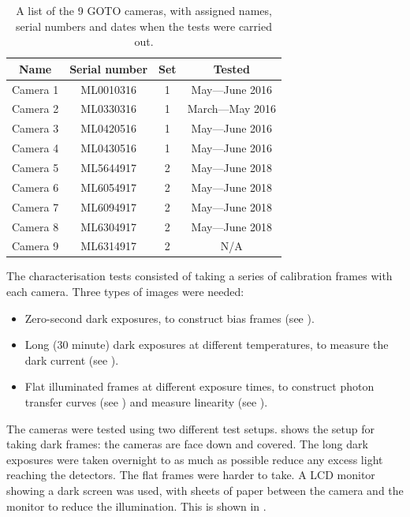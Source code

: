 \begin{colsection}
\begin{colsection}
\begin{table}[t]
    \begin{center}
        \begin{tabular}{c|ccc} %
            Name     & Serial number & Set & Tested \\
            \midrule
            Camera 1 & ML0010316     &   1 & May---June 2016  \\
            Camera 2 & ML0330316     &   1 & March---May 2016 \\
            Camera 3 & ML0420516     &   1 & May---June 2016  \\
            Camera 4 & ML0430516     &   1 & May---June 2016  \\
            Camera 5 & ML5644917     &   2 & May---June 2018  \\
            Camera 6 & ML6054917     &   2 & May---June 2018  \\
            Camera 7 & ML6094917     &   2 & May---June 2018  \\
            Camera 8 & ML6304917     &   2 & May---June 2018  \\
            Camera 9 & ML6314917     &   2 & N/A              \\
        \end{tabular}
    \end{center}
    \caption[List of GOTO cameras]{
        A list of the 9 GOTO cameras, with assigned names, serial numbers and dates when the tests were carried out.
    }\label{tab:cameras}
\end{table}

\newpage

The characterisation tests consisted of taking a series of calibration frames with each camera. Three types of images were needed:

\begin{itemize}
    \item Zero-second dark exposures, to construct bias frames (see ).
    \item Long (30 minute) dark exposures at different temperatures, to measure the dark current (see ).
    \item Flat illuminated frames at different exposure times, to construct photon transfer curves (see ) and measure linearity (see ).
\end{itemize}

The cameras were tested using two different test setups.  shows the setup for taking dark frames: the cameras are face down and covered. The long dark exposures were taken overnight to as much as possible reduce any excess light reaching the detectors. The flat frames were harder to take. A LCD monitor showing a dark screen was used, with sheets of paper between the camera and the monitor to reduce the illumination. This is shown in .


\end{colsection}
\end{colsection}
